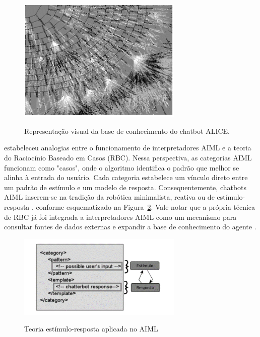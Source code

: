 \documentclass[a4paper,oneside]{book}
\begin{document}
\begin{figure}
    \centering
    \caption{Representação visual da base de conhecimento do chatbot ALICE.}
    \includegraphics[width=0.7\textwidth]{./04-figuras/image9} %
    \label{fig:representacaovisual}
    \vspace{0.2cm} %
    {\footnotesize \cite{Wallace2003}}
\end{figure}

\cite{Wallace2000} estabeleceu analogias entre o funcionamento de interpretadores AIML e a teoria do Raciocínio Baseado em Casos (RBC). Nessa perspectiva, as categorias AIML funcionam como "casos", onde o algoritmo identifica o padrão que melhor se alinha à entrada do usuário. Cada categoria estabelece um vínculo direto entre um padrão de estímulo e um modelo de resposta. Consequentemente, chatbots AIML inserem-se na tradição da robótica minimalista, reativa ou de estímulo-resposta \cite{Wallace2000}, conforme esquematizado na Figura~\ref{fig:teoriaestimulo}. Vale notar que a própria técnica de RBC já foi integrada a interpretadores AIML como um mecanismo para consultar fontes de dados externas e expandir a base de conhecimento do agente \cite{Kraus2008}.

\begin{figure}
    \centering
    \caption{Teoria estímulo-resposta aplicada no AIML}
    \includegraphics[width=0.7\textwidth]{./04-figuras/image10} %
    \label{fig:teoriaestimulo}
    \vspace{0.2cm}
    {\footnotesize \cite{Lima2017}}
\end{figure}
\end{document}
